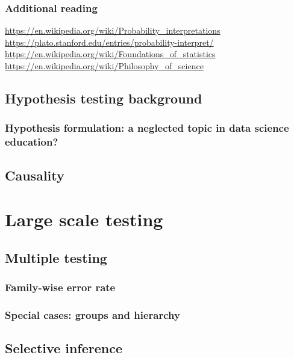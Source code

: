 \documentclass[]{book}
\theoremstyle{definition}
\theoremstyle{definition}
\theoremstyle{definition}
\theoremstyle{remark}
\begin{document}
\subsection{Additional reading}\label{additional-reading-1}

\url{https://en.wikipedia.org/wiki/Probability_interpretations}
\url{https://plato.stanford.edu/entries/probability-interpret/}
\url{https://en.wikipedia.org/wiki/Foundations_of_statistics}
\url{https://en.wikipedia.org/wiki/Philosophy_of_science}

\section{Hypothesis testing
background}\label{hypothesis-testing-background}

\subsection{Hypothesis formulation: a neglected topic in data science
education?}\label{hypothesis-formulation-a-neglected-topic-in-data-science-education}

\section{Causality}\label{causality}

\chapter{Large scale testing}\label{large-scale-testing}

\section{Multiple testing}\label{multiple-testing}

\subsection{Family-wise error rate}\label{family-wise-error-rate}

\subsection{Special cases: groups and
hierarchy}\label{special-cases-groups-and-hierarchy}

\section{Selective inference}\label{selective-inference}
\end{document}
